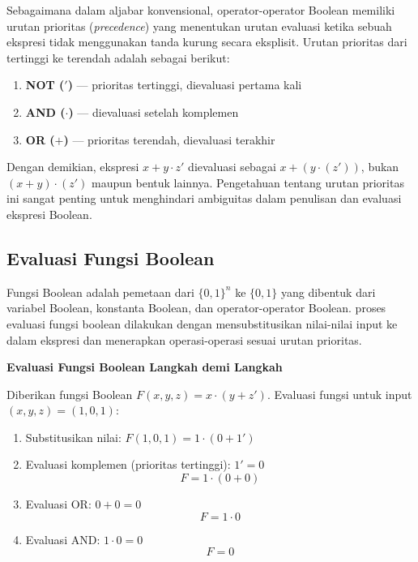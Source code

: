 Sebagaimana dalam aljabar konvensional, operator-operator Boolean memiliki urutan prioritas (\textit{precedence}) yang menentukan urutan evaluasi ketika sebuah ekspresi tidak menggunakan tanda kurung secara eksplisit. Urutan prioritas dari tertinggi ke terendah adalah sebagai berikut:

\begin{enumerate}
  \item \textbf{NOT ($'$)} --- prioritas tertinggi, dievaluasi pertama kali
  \item \textbf{AND ($\cdot$)} --- dievaluasi setelah komplemen
  \item \textbf{OR ($+$)} --- prioritas terendah, dievaluasi terakhir
\end{enumerate}

Dengan demikian, ekspresi $x + y \cdot z'$ dievaluasi sebagai $x + (y \cdot (z'))$, bukan $(x + y) \cdot (z')$ maupun bentuk lainnya. Pengetahuan tentang urutan prioritas ini sangat penting untuk menghindari ambiguitas dalam penulisan dan evaluasi ekspresi Boolean.

\subsection{Evaluasi Fungsi Boolean}

Fungsi Boolean adalah pemetaan dari $\{0,1\}^n$ ke $\{0,1\}$ yang dibentuk dari variabel Boolean, konstanta Boolean, dan operator-operator Boolean. proses evaluasi fungsi boolean dilakukan dengan mensubstitusikan nilai-nilai input ke dalam ekspresi dan menerapkan operasi-operasi sesuai urutan prioritas.

\begin{contoh}
\textbf{Evaluasi Fungsi Boolean Langkah demi Langkah}

Diberikan fungsi Boolean $F(x,y,z) = x \cdot (y + z')$. Evaluasi fungsi untuk input $(x, y, z) = (1, 0, 1)$:

\begin{enumerate}
    \item Substitusikan nilai: $F(1,0,1) = 1 \cdot (0 + 1')$
    \item Evaluasi komplemen (prioritas tertinggi): $1' = 0$
    \[ F = 1 \cdot (0 + 0) \]
    \item Evaluasi OR: $0 + 0 = 0$
    \[ F = 1 \cdot 0 \]
    \item Evaluasi AND: $1 \cdot 0 = 0$
    \[ F = 0 \]
\end{enumerate}
\end{contoh}

